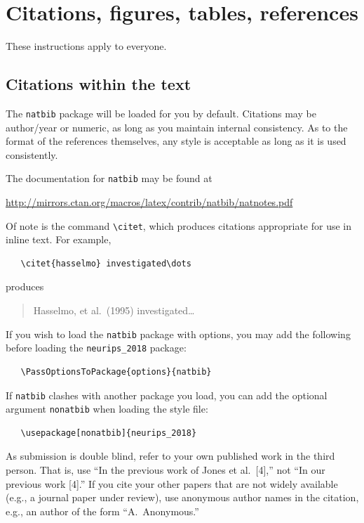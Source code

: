 \documentclass{article}
\begin{document}
\section{Citations, figures, tables, references}
\label{others}

These instructions apply to everyone.

\subsection{Citations within the text}

The \verb+natbib+ package will be loaded for you by default.  Citations may be
author/year or numeric, as long as you maintain internal consistency.  As to the
format of the references themselves, any style is acceptable as long as it is
used consistently.

The documentation for \verb+natbib+ may be found at
\begin{center}
  \url{http://mirrors.ctan.org/macros/latex/contrib/natbib/natnotes.pdf}
\end{center}
Of note is the command \verb+\citet+, which produces citations appropriate for
use in inline text.  For example,
\begin{verbatim}
   \citet{hasselmo} investigated\dots
\end{verbatim}
produces
\begin{quote}
  Hasselmo, et al.\ (1995) investigated\dots
\end{quote}

If you wish to load the \verb+natbib+ package with options, you may add the
following before loading the \verb+neurips_2018+ package:
\begin{verbatim}
   \PassOptionsToPackage{options}{natbib}
\end{verbatim}

If \verb+natbib+ clashes with another package you load, you can add the optional
argument \verb+nonatbib+ when loading the style file:
\begin{verbatim}
   \usepackage[nonatbib]{neurips_2018}
\end{verbatim}

As submission is double blind, refer to your own published work in the third
person. That is, use ``In the previous work of Jones et al.\ [4],'' not ``In our
previous work [4].'' If you cite your other papers that are not widely available
(e.g., a journal paper under review), use anonymous author names in the
citation, e.g., an author of the form ``A.\ Anonymous.''
\end{document}
